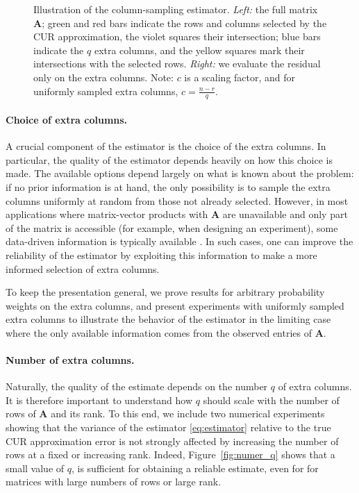 \documentclass[11pt]{article}
\begin{document}
\begin{figure}[h]
{{%
}
}
    \caption{Illustration of the column-sampling estimator. \emph{Left:} the full
        matrix $\mathbf{A}$; green and red bars indicate the rows and columns selected by the CUR
        approximation, the violet squares their intersection; blue bars indicate the $q$ extra columns, and the yellow
        squares mark their intersections with the selected rows. \emph{Right:} we evaluate the residual only on the extra columns. Note: $c$ is a scaling factor, and for uniformly sampled extra columns, $c=\frac{n-r}{q}$.}
    \label{fig:ill-estimate}
\end{figure}
\paragraph{Choice of extra columns.}
A crucial component of the estimator is the choice of the extra columns. In particular, the quality of the estimator depends heavily on how this choice is made.
The available options depend largely on what is known about the problem: if no prior information is at hand, the only possibility is to sample the extra columns uniformly at random from those not already selected.
However, in most applications where matrix-vector products with $\mathbf{A}$ are unavailable and only part of the matrix is accessible (for example, when designing an experiment), some data-driven information is typically available \cite{meier2026reducingacquisitiontimeradiation}.
In such cases, one can improve the reliability of the estimator by exploiting this information to make a more informed selection of extra columns.

To keep the presentation general, we prove results for arbitrary probability weights on the extra columns, and present experiments with uniformly sampled extra columns to illustrate the behavior of the estimator in the limiting case where the only available information comes from the observed entries of $\mathbf{A}$.

\paragraph{Number of extra columns.}
Naturally, the quality of the estimate depends on the number $q$ of extra columns.
It is therefore important to understand how $q$ should scale with the number of rows of $\mathbf{A}$ and its rank.
To this end, we include two numerical experiments showing that the variance of the estimator \eqref{eq:estimator} relative to the true CUR approximation error is not strongly affected by increasing the number of rows at a fixed or increasing rank.
Indeed, Figure~\ref{fig:numer_q} shows that a small value of $q$, is sufficient for obtaining a reliable estimate, even for for matrices with large numbers of rows or large rank.
\end{document}
